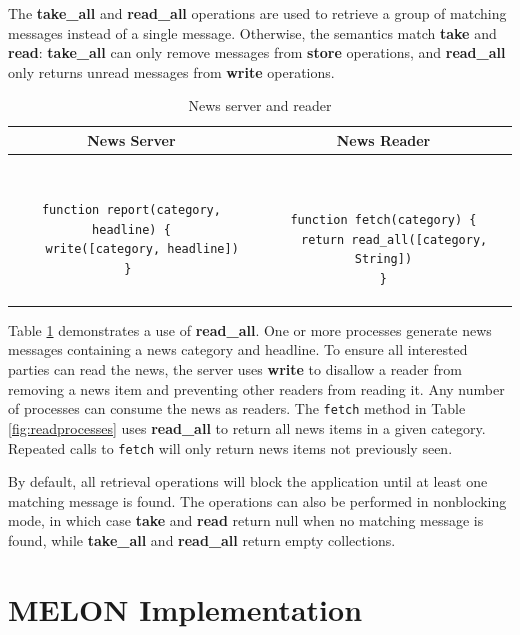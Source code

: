 \documentclass{llncs}
\begin{document}
The \textbf{take\_all} and \textbf{read\_all} operations are used to retrieve a group of matching messages instead of a single message. Otherwise, the semantics match \textbf{take} and \textbf{read}: \textbf{take\_all} can only remove messages from \textbf{store} operations, and \textbf{read\_all} only returns unread messages from \textbf{write} operations.

\begin{table}
\centering
\caption{News server and reader}
\begin{tabular}{|c|c|} \hline
\textbf{News Server} & \textbf{News Reader} \\ \hline
\begin{minipage}{2.45in}
\begin{verbatim}

function report(category, headline) {
   write([category, headline])
} 
\end{verbatim}
\end{minipage}
&
\begin{minipage}{2.5in}
\begin{verbatim}


function fetch(category) {
   return read_all([category, String])
}
\end{verbatim}
\end{minipage}
\\ \hline
\end{tabular}
\label{fig:newsreader}
\end{table}

Table \ref{fig:newsreader} demonstrates a use of \textbf{read\_all}. One or more processes generate news messages containing a news category and headline. To ensure all interested parties can read the news, the server uses \textbf{write} to disallow a reader from removing a news item and preventing other readers from reading it. Any number of processes can consume the news as readers. The \texttt{fetch} method in Table \ref{fig:readprocesses} uses \textbf{read\_all} to return all news items in a given category. Repeated calls to \texttt{fetch} will only return news items not previously seen.

By default, all retrieval operations will block the application until at least one matching message is found. The operations can also be performed in nonblocking mode, in which case \textbf{take} and \textbf{read} return null when no matching message is found, while \textbf{take\_all} and \textbf{read\_all} return empty collections.
   
\section{MELON Implementation}\label{sec:implementation}
\end{document}
